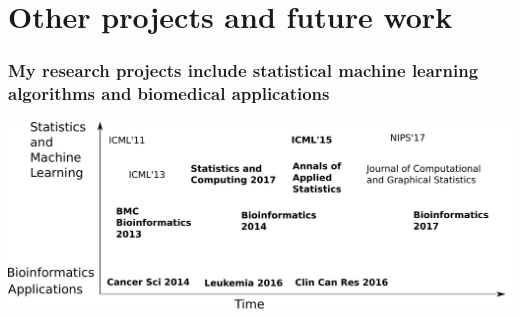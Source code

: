 \documentclass{beamer}
\begin{document}
\section{Other projects and future work}

\begin{frame}
  \frametitle{My research projects include statistical machine
    learning algorithms and biomedical applications}
  \includegraphics[width=\textwidth]{timeline-SteJustine}
\end{frame}
\end{document}
